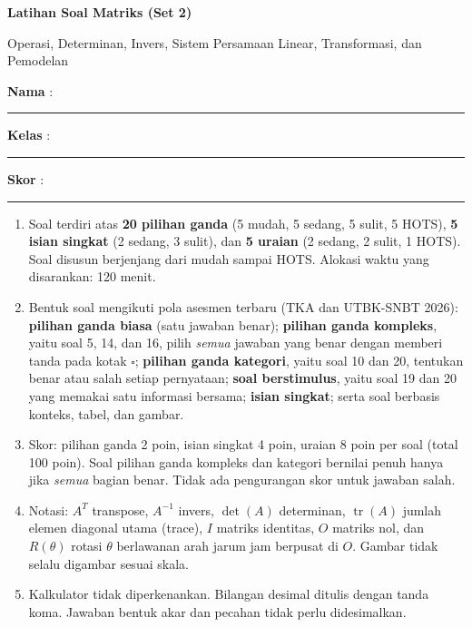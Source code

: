 \documentclass[a4paper,11pt]{article}
\newcommand{\tr}{\operatorname{tr}}
\newcounter{no}
\begin{document}
\thispagestyle{fancy}

\begin{center}
  {\color{mainc}\fontsize{22}{26}\selectfont\bfseries Latihan Soal Matriks (Set 2)\par}
  \vspace{2pt}
  {\color{accc}\large Operasi, Determinan, Invers, Sistem Persamaan Linear, Transformasi, dan Pemodelan\par}
\end{center}
\vspace{2pt}
\begin{tcolorbox}[colback=softbg,colframe=mainc!40,boxrule=0.6pt,arc=3pt,left=8pt,right=8pt,top=5pt,bottom=5pt]
\noindent\textbf{Nama} : \rule{4.6cm}{0.4pt}\hfill\textbf{Kelas} : \rule{2.2cm}{0.4pt}\hfill\textbf{Skor} : \rule{2.2cm}{0.4pt}
\end{tcolorbox}
\vspace{2pt}
\begin{tcolorbox}[colback=white,colframe=accc,boxrule=0.8pt,arc=3pt,left=8pt,right=8pt,top=4pt,bottom=4pt,title={\bfseries Petunjuk Pengerjaan},coltitle=white,fonttitle=\small]
\small
\begin{enumerate}[leftmargin=1.4em,itemsep=1pt,topsep=1pt]
\item Soal terdiri atas \textbf{20 pilihan ganda} (5 mudah, 5 sedang, 5 sulit, 5 HOTS), \textbf{5 isian singkat} (2 sedang, 3 sulit), dan \textbf{5 uraian} (2 sedang, 2 sulit, 1 HOTS). Soal disusun berjenjang dari mudah sampai HOTS. Alokasi waktu yang disarankan: 120 menit.
\item Bentuk soal mengikuti pola asesmen terbaru (TKA dan UTBK-SNBT 2026): \textbf{pilihan ganda biasa} (satu jawaban benar); \textbf{pilihan ganda kompleks}, yaitu soal 5, 14, dan 16, pilih \emph{semua} jawaban yang benar dengan memberi tanda pada kotak $\square$; \textbf{pilihan ganda kategori}, yaitu soal 10 dan 20, tentukan benar atau salah setiap pernyataan; \textbf{soal berstimulus}, yaitu soal 19 dan 20 yang memakai satu informasi bersama; \textbf{isian singkat}; serta soal berbasis konteks, tabel, dan gambar.
\item Skor: pilihan ganda 2 poin, isian singkat 4 poin, uraian 8 poin per soal (total 100 poin). Soal pilihan ganda kompleks dan kategori bernilai penuh hanya jika \emph{semua} bagian benar. Tidak ada pengurangan skor untuk jawaban salah.
\item Notasi: $A^T$ transpose, $A^{-1}$ invers, $\det(A)$ determinan, $\tr(A)$ jumlah elemen diagonal utama (trace), $I$ matriks identitas, $O$ matriks nol, dan $R(\theta)$ rotasi $\theta$ berlawanan arah jarum jam berpusat di $O$. Gambar tidak selalu digambar sesuai skala.
\item Kalkulator tidak diperkenankan. Bilangan desimal ditulis dengan tanda koma. Jawaban bentuk akar dan pecahan tidak perlu didesimalkan.
\end{enumerate}
\end{tcolorbox}
\end{document}
